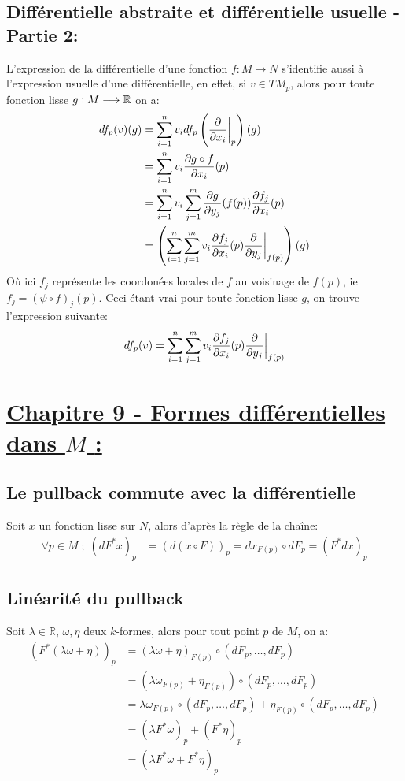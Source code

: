    \subsection*{Différentielle abstraite et différentielle usuelle - Partie 2:}
      L'expression de la différentielle d'une fonction \( f : M \longrightarrow N \) s'identifie aussi à l'expression usuelle d'une différentielle, en effet, si \( v \in TM_p \), alors pour toute fonction lisse \( g : M \longrightarrow \mathbb{R} \) on a:
      \begin{align*}
         df_p(v)(g) &= \sum_{i=1}^n v_i df_p\left(\frac{\partial }{\partial x_i}\biggr|_p\right)(g)\\
         &= \sum_{i=1}^n v_i \frac{\partial g \circ f}{\partial x_i}(p)\\
         &= \sum_{i=1}^n v_i \sum_{j=1}^m \frac{\partial g}{\partial y_j}(f(p)) \frac{\partial f_j}{\partial x_i}(p)\\
         &= \left(\sum_{i=1}^n\sum_{j=1}^m v_i \frac{\partial f_j}{\partial x_i}(p)\frac{\partial }{\partial y_j}\biggr|_{f(p)}\right)(g)
      \end{align*}
      Où ici \( f_j \) représente les coordonées locales de \( f \) au voisinage de \( f(p) \), ie \( f_j = (\psi \circ f)_j(p) \). Ceci étant vrai pour toute fonction lisse \( g \), on trouve l'expression suivante:
      \[ 
         df_p(v) = \sum_{i=1}^n\sum_{j=1}^m v_i \frac{\partial f_j}{\partial x_i}(p)\frac{\partial }{\partial y_j}\biggr|_{f(p)}
      \]

\pagebreak
\section*{\uline{Chapitre 9 - Formes différentielles dans \( M \) {:}}}
   \subsection*{Le pullback commute avec la différentielle}
      Soit $x$ un fonction lisse sur $N$, alors d’après la règle de la chaîne:
      \begin{align*}
         \forall p \in M \; ; \; (dF^*x)_p &= (d(x \circ F))_p = dx_{F(p)} \circ dF_p = (F^*dx)_p 
      \end{align*}
   \subsection*{Linéarité du pullback}  
      Soit $\lambda \in \mathbb{R}$, $\omega, \eta$ deux $k$-formes, alors pour tout point $p$ de $M$, on a:
      \begin{align*}
         (F^*(\lambda\omega + \eta))_p &= (\lambda\omega + \eta)_{F(p)} \circ (dF_p, \ldots, dF_p)\\ 
         &=  (\lambda\omega_{F(p)} + \eta_{F(p)}) \circ (dF_p, \ldots, dF_p)\\ 
         &= \lambda\omega_{F(p)} \circ (dF_p, \ldots, dF_p) + \eta_{F(p)} \circ (dF_p, \ldots, dF_p)\\ 
         &= (\lambda F^*\omega)_p + (F^*\eta)_p\\
         &= (\lambda F^*\omega + F^*\eta)_p
      \end{align*}
